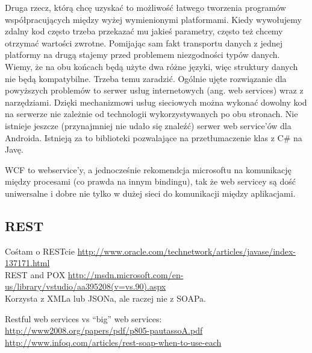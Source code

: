 Druga rzecz, którą chcę uzyskać to możliwość łatwego tworzenia programów współpracujących między wyżej wymienionymi platformami. Kiedy wywołujemy zdalny kod często trzeba przekazać mu jakieś parametry, często też chcemy otrzymać wartości zwrotne. Pomijając sam fakt transportu danych z jednej platformy na drugą stajemy przed problemem niezgodności typów danych. Wiemy, że na obu końcach będą użyte dwa różne języki, więc struktury danych nie będą kompatybilne. Trzeba temu zaradzić.
Ogólnie ujęte rozwiązanie dla powyższych problemów to serwer usług internetowych (ang. web services) wraz z narzędziami. Dzięki mechanizmowi usług sieciowych można wykonać dowolny kod na serwerze nie zależnie od technologii wykorzystywanych po obu stronach. Nie istnieje jeszcze (przynajmniej nie udało się znaleźć) serwer web service’ów dla Androida. Istnieją za to biblioteki pozwalające na przetłumaczenie klas z C\# na Javę.

WCF to webservice'y, a jednocześnie rekomendcja microsoftu na komunikację między procesami (co prawda na innym bindingu), tak że web servicey są dość uniwersalne i dobre nie tylko w dużej sieci do komunikacji między aplikacjami.

\subsection{REST}
Cośtam o RESTcie \url{http://www.oracle.com/technetwork/articles/javase/index-137171.html}\\
REST and POX \url{http://msdn.microsoft.com/en-us/library/vstudio/aa395208(v=vs.90).aspx}\\

Korzysta z XMLa lub JSONa, ale raczej nie z SOAPa.

Restful web services vs ``big'' web services: \url{http://www2008.org/papers/pdf/p805-pautassoA.pdf}\\
\url{http://www.infoq.com/articles/rest-soap-when-to-use-each}\\